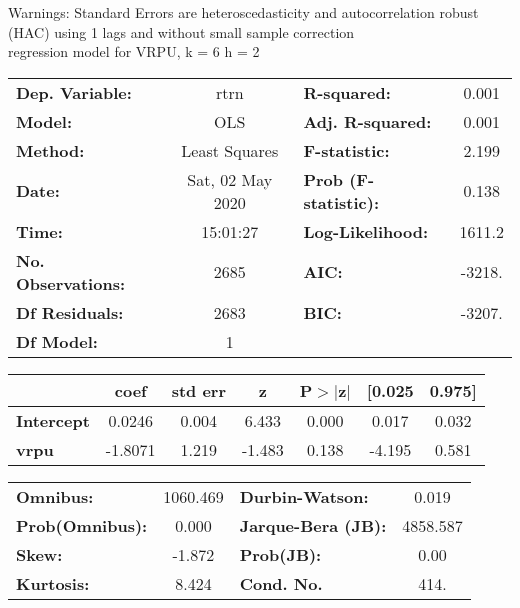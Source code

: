 Warnings: \newline
 [1] Standard Errors are heteroscedasticity and autocorrelation robust (HAC) using 1 lags and without small sample correction\\ 

regression model for VRPU, k = 6 h = 2\begin{center}
\begin{tabular}{lclc}
\toprule
\textbf{Dep. Variable:}    &       rtrn       & \textbf{  R-squared:         } &     0.001   \\
\textbf{Model:}            &       OLS        & \textbf{  Adj. R-squared:    } &     0.001   \\
\textbf{Method:}           &  Least Squares   & \textbf{  F-statistic:       } &     2.199   \\
\textbf{Date:}             & Sat, 02 May 2020 & \textbf{  Prob (F-statistic):} &    0.138    \\
\textbf{Time:}             &     15:01:27     & \textbf{  Log-Likelihood:    } &    1611.2   \\
\textbf{No. Observations:} &        2685      & \textbf{  AIC:               } &    -3218.   \\
\textbf{Df Residuals:}     &        2683      & \textbf{  BIC:               } &    -3207.   \\
\textbf{Df Model:}         &           1      & \textbf{                     } &             \\
\bottomrule
\end{tabular}
\begin{tabular}{lcccccc}
                   & \textbf{coef} & \textbf{std err} & \textbf{z} & \textbf{P$> |$z$|$} & \textbf{[0.025} & \textbf{0.975]}  \\
\midrule
\textbf{Intercept} &       0.0246  &        0.004     &     6.433  &         0.000        &        0.017    &        0.032     \\
\textbf{vrpu}      &      -1.8071  &        1.219     &    -1.483  &         0.138        &       -4.195    &        0.581     \\
\bottomrule
\end{tabular}
\begin{tabular}{lclc}
\textbf{Omnibus:}       & 1060.469 & \textbf{  Durbin-Watson:     } &    0.019  \\
\textbf{Prob(Omnibus):} &   0.000  & \textbf{  Jarque-Bera (JB):  } & 4858.587  \\
\textbf{Skew:}          &  -1.872  & \textbf{  Prob(JB):          } &     0.00  \\
\textbf{Kurtosis:}      &   8.424  & \textbf{  Cond. No.          } &     414.  \\
\bottomrule
\end{tabular}
\end{center}

